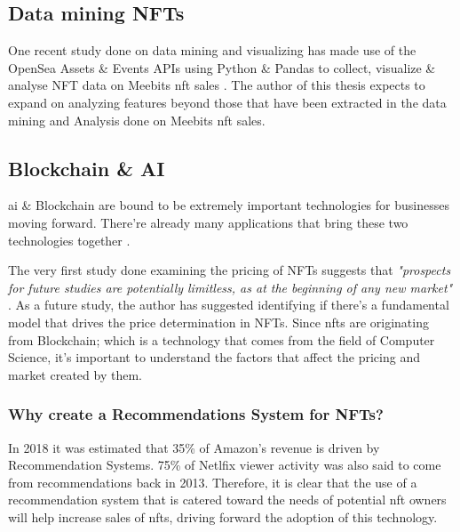 
\subsection{Data mining NFTs}
One recent study done on data mining and visualizing has made use of the OpenSea Assets \& Events APIs using Python \& Pandas to collect, visualize \& analyse NFT data on Meebits \autocite{larva_labs_meebits_nodate} \gls{nft} sales \autocite{adil_moujahid_data_2021}. The author of this thesis expects to expand on analyzing features beyond those that have been extracted in the data mining and Analysis done on Meebits \gls{nft} sales.


\subsection{Blockchain \& AI}
\gls{ai} \& Blockchain are bound to be extremely important technologies for businesses moving forward. There're already many applications that bring these two technologies together \autocite{gwyneth_iredale_are_2021}.

The very first study done examining the pricing of NFTs suggests that \emph{"prospects for future studies are potentially limitless, as at the beginning of any new market"} \autocite{dowling_fertile_2021}. As a future study, the author has suggested identifying if there's a fundamental model that drives the price determination in NFTs.
Since \gls{nft}s are originating from Blockchain; which is a technology that comes from the field of Computer Science, it's important to understand the factors that affect the pricing and market created by them.

\subsubsection{Why create a Recommendations System for NFTs?}
In 2018 it was estimated that 35\% of Amazon's revenue \cite{naumov_deep_2019} is driven by Recommendation Systems. 75\% of Netlfix viewer activity \cite{vanderbilt_science_nodate} was also said to come from recommendations back in 2013. Therefore, it is clear that the use of a recommendation system that is catered toward the needs of potential \gls{nft} owners will help increase sales of \gls{nft}s, driving forward the adoption of this technology.


